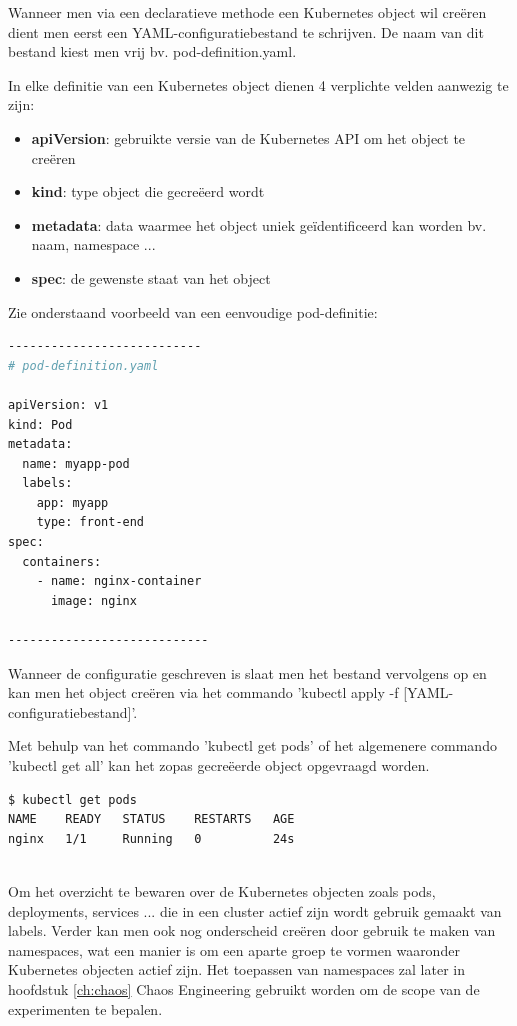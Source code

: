 Wanneer men via een declaratieve methode een Kubernetes object wil creëren dient men eerst een YAML-configuratiebestand te schrijven. De naam van dit bestand kiest men vrij bv. pod-definition.yaml.

In elke definitie van een Kubernetes object dienen 4 verplichte velden aanwezig te zijn:
\begin{itemize}
    \item {\bf apiVersion}: gebruikte versie van de Kubernetes API om het object te creëren
    \item {\bf kind}: type object die gecreëerd wordt
    \item {\bf metadata}: data waarmee het object uniek geïdentificeerd kan worden bv. naam, namespace ...
    \item {\bf spec}: de gewenste staat van het object
\end{itemize}

Zie onderstaand voorbeeld van een eenvoudige pod-definitie:

\begin{lstlisting}[language=bash]
---------------------------
# pod-definition.yaml

apiVersion: v1
kind: Pod
metadata:
  name: myapp-pod
  labels:
    app: myapp
    type: front-end
spec:
  containers:
    - name: nginx-container
      image: nginx

----------------------------
\end{lstlisting}

Wanneer de configuratie geschreven is slaat men het bestand vervolgens op en kan men het object creëren via het commando 'kubectl apply -f [YAML-configuratiebestand]'. 

Met behulp van het commando 'kubectl get pods' of het algemenere commando 'kubectl get all' kan het zopas gecreëerde object opgevraagd worden. 

\begin{lstlisting}[language=bash]
$ kubectl get pods
NAME    READY   STATUS    RESTARTS   AGE
nginx   1/1     Running   0          24s
    
\end{lstlisting}

Om het overzicht te bewaren over de Kubernetes objecten zoals pods, deployments, services ... die in een cluster actief zijn wordt gebruik gemaakt van labels. Verder kan men ook nog onderscheid creëren door gebruik te maken van namespaces, wat een manier is om een aparte groep te vormen waaronder Kubernetes objecten actief zijn. Het toepassen van namespaces zal later in hoofdstuk \ref{ch:chaos} Chaos Engineering gebruikt worden om de scope van de experimenten te bepalen. 

